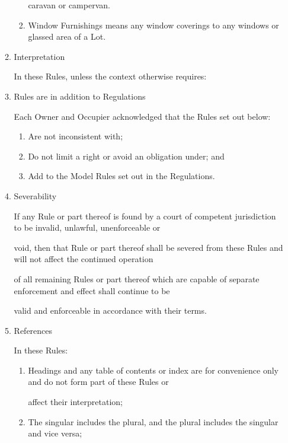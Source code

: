 \documentclass{article}
\begin{document}
\begin{enumerate}[label=\arabic*.]
\begin{enumerate}[label=\arabic{enumi}.\arabic*.]
\begin{enumerate}[label=(\arabic*)]
caravan or campervan. 

\item  Window Furnishings means any window coverings to any windows or glassed area of a Lot. 

\end{enumerate}
\item  Interpretation 

In these Rules, unless the context otherwise requires: 

\item  Rules are in addition to Regulations 

Each Owner and Occupier acknowledged that the Rules set out below: 

\newpage

\begin{enumerate}[label=(\arabic*)]
\item  Are not inconsistent with; 

\item  Do not limit a right or avoid an obligation under; and 

\item  Add to the Model Rules set out in the Regulations. 

\end{enumerate}
\item  Severability 

If any Rule or part thereof is found by a court of competent jurisdiction to be invalid, unlawful, unenforceable or 

void, then that Rule or part thereof shall be severed from these Rules and will not affect the continued operation 

of all remaining Rules or part thereof which are capable of separate enforcement and effect shall continue to be 

valid and enforceable in accordance with their terms. 

\item  References 

In these Rules: 

\begin{enumerate}[label=(\arabic*)]
\item  Headings and any table of contents or index are for convenience only and do not form part of these Rules or 

affect their interpretation; 

\item  The singular includes the plural, and the plural includes the singular and vice versa; 


\end{enumerate}
\end{enumerate}
\end{enumerate}
\end{document}
